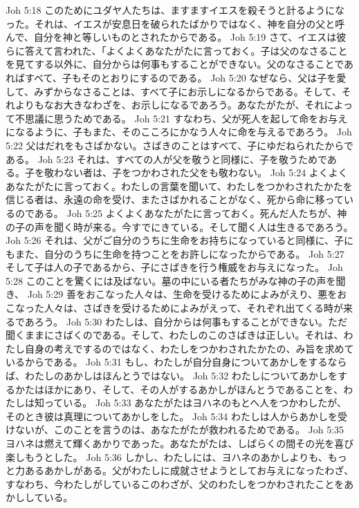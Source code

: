 Joh 5:18  このためにユダヤ人たちは、ますますイエスを殺そうと計るようになった。それは、イエスが安息日を破られたばかりではなく、神を自分の父と呼んで、自分を神と等しいものとされたからである。
Joh 5:19  さて、イエスは彼らに答えて言われた、「よくよくあなたがたに言っておく。子は父のなさることを見てする以外に、自分からは何事もすることができない。父のなさることであればすべて、子もそのとおりにするのである。
Joh 5:20  なぜなら、父は子を愛して、みずからなさることは、すべて子にお示しになるからである。そして、それよりもなお大きなわざを、お示しになるであろう。あなたがたが、それによって不思議に思うためである。
Joh 5:21  すなわち、父が死人を起して命をお与えになるように、子もまた、そのこころにかなう人々に命を与えるであろう。
Joh 5:22  父はだれをもさばかない。さばきのことはすべて、子にゆだねられたからである。
Joh 5:23  それは、すべての人が父を敬うと同様に、子を敬うためである。子を敬わない者は、子をつかわされた父をも敬わない。
Joh 5:24  よくよくあなたがたに言っておく。わたしの言葉を聞いて、わたしをつかわされたかたを信じる者は、永遠の命を受け、またさばかれることがなく、死から命に移っているのである。
Joh 5:25  よくよくあなたがたに言っておく。死んだ人たちが、神の子の声を聞く時が来る。今すでにきている。そして聞く人は生きるであろう。
Joh 5:26  それは、父がご自分のうちに生命をお持ちになっていると同様に、子にもまた、自分のうちに生命を持つことをお許しになったからである。
Joh 5:27  そして子は人の子であるから、子にさばきを行う権威をお与えになった。
Joh 5:28  このことを驚くには及ばない。墓の中にいる者たちがみな神の子の声を聞き、
Joh 5:29  善をおこなった人々は、生命を受けるためによみがえり、悪をおこなった人々は、さばきを受けるためによみがえって、それぞれ出てくる時が来るであろう。
Joh 5:30  わたしは、自分からは何事もすることができない。ただ聞くままにさばくのである。そして、わたしのこのさばきは正しい。それは、わたし自身の考えでするのではなく、わたしをつかわされたかたの、み旨を求めているからである。
Joh 5:31  もし、わたしが自分自身についてあかしをするならば、わたしのあかしはほんとうではない。
Joh 5:32  わたしについてあかしをするかたはほかにあり、そして、その人がするあかしがほんとうであることを、わたしは知っている。
Joh 5:33  あなたがたはヨハネのもとへ人をつかわしたが、そのとき彼は真理についてあかしをした。
Joh 5:34  わたしは人からあかしを受けないが、このことを言うのは、あなたがたが救われるためである。
Joh 5:35  ヨハネは燃えて輝くあかりであった。あなたがたは、しばらくの間その光を喜び楽しもうとした。
Joh 5:36  しかし、わたしには、ヨハネのあかしよりも、もっと力あるあかしがある。父がわたしに成就させようとしてお与えになったわざ、すなわち、今わたしがしているこのわざが、父のわたしをつかわされたことをあかししている。
